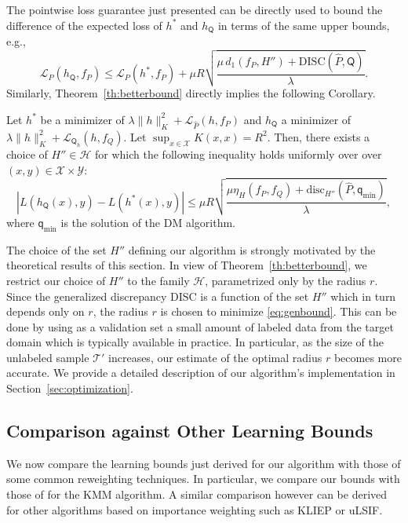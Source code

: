 \documentclass[twoside,11pt]{article}
\providecommand{\norm}[2]{\lVert#1\rVert_{#2}}
\newcommand{\h}{\widehat}
\newcommand{\cL}{{\mathcal L}}
\newcommand{\cT}{{\mathcal T}}
\newcommand{\cX}{{\mathcal X}}
\newcommand{\cY}{{\mathcal Y}}
\newcommand{\1}{\mat{1}}
\newcommand{\qq}{{\mathsf q}}
\newcommand{\QQ}{{\mathsf Q}}
\newcommand{\qmin}{{\qq_\text{min}}}
\newcommand{\dis}{\mathrm{disc}}
\newcommand{\DIS}{\mathrm{DISC}}
\newcommand{\done}{d_1}
\begin{document}
The pointwise loss guarantee just presented can be directly used to
bound the difference of the expected loss of $h^*$ and $h_\QQ$ in
terms of the same upper bounds, e.g.,
\begin{equation}
\label{eq:genbound}
\cL_P(h_\QQ, f_P) \leq \cL_P(h^*, f_P) +
\mu R \sqrt{\frac{\mu \, \done(f_P, H'') +
\DIS(\h P, \QQ)}{\lambda}}.
\end{equation}
Similarly, Theorem~\ref{th:betterbound} directly implies the following
Corollary.

\begin{corollary}
\label{coro:pointwise2}
Let $h^*$ be a minimizer of
$\lambda \norm{h}{K}^2 + \cL_{\h P}(h, f_P)$ and $h_\QQ$ a minimizer of
$\lambda \norm{h}{K}^2 +\cL_{\QQ_h}(h, f_Q)$.  Let
$\sup_{x \in \cX} K(x, x) = R^2$.
Then, there exists a choice of $H'' \in {\mathscr H}$ for which the
following inequality holds uniformly over over $(x,y) \in \cX \times \cY$:
\begin{equation*}
|L(h_\QQ(x), y) - L(h^*(x), y)|
\leq \mu R \sqrt{\!\frac{\mu \eta_H(f_P, f_Q) \! + \!
\dis_{H''}(\h P, \qmin)}{\lambda}},
\end{equation*}
where $\qmin$ is the solution of the DM algorithm.
\end{corollary}

The choice of the set $H''$ defining our algorithm is strongly
motivated by the theoretical results of this section. In view of
Theorem~\ref{th:betterbound}, we restrict our choice of $H''$ to the
family $\mathscr{H}$, parametrized only by the radius $r$. Since the
generalized discrepancy $\DIS$ is a function of the set $H''$ which in
turn depends only on $r$, the radius $r$ is chosen to minimize
\eqref{eq:genbound}. This can be done by using as a validation set a
small amount of labeled data from the target domain which is typically
available in practice.  In particular, as the size of the unlabeled
sample $\cT'$ increases, our estimate of the optimal radius $r$
becomes more accurate. We provide a detailed description of our
algorithm's implementation in Section~\ref{sec:optimization}.

\subsection{Comparison against Other Learning Bounds}
\label{sec:comparison}

We now compare the learning bounds just derived for our algorithm with
those of some common reweighting techniques. In particular, we compare
our bounds with those of \cite{CortesMohriRileyRostamizadeh2008} for the KMM
algorithm. A similar comparison however can be derived for other
algorithms based on importance weighting such as KLIEP or uLSIF.
\end{document}
